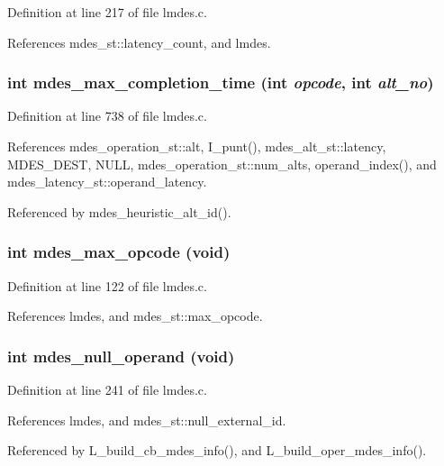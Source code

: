 Definition at line 217 of file lmdes.c.

References mdes\_\-st::latency\_\-count, and lmdes.
\subsubsection{\setlength{\rightskip}{0pt plus 5cm}int mdes\_\-max\_\-completion\_\-time (int {\em opcode}, int {\em alt\_\-no})}\label{lmdes_8c_589f30951568d11531047a7b3404e6ac}




Definition at line 738 of file lmdes.c.

References mdes\_\-operation\_\-st::alt, I\_\-punt(), mdes\_\-alt\_\-st::latency, MDES\_\-DEST, NULL, mdes\_\-operation\_\-st::num\_\-alts, operand\_\-index(), and mdes\_\-latency\_\-st::operand\_\-latency.

Referenced by mdes\_\-heuristic\_\-alt\_\-id().
\subsubsection{\setlength{\rightskip}{0pt plus 5cm}int mdes\_\-max\_\-opcode (void)}\label{lmdes_8c_87c24ac7a003ff4ced90a725d84644f0}




Definition at line 122 of file lmdes.c.

References lmdes, and mdes\_\-st::max\_\-opcode.
\subsubsection{\setlength{\rightskip}{0pt plus 5cm}int mdes\_\-null\_\-operand (void)}\label{lmdes_8c_57537f171f1012dd9f07c719b258cec3}




Definition at line 241 of file lmdes.c.

References lmdes, and mdes\_\-st::null\_\-external\_\-id.

Referenced by L\_\-build\_\-cb\_\-mdes\_\-info(), and L\_\-build\_\-oper\_\-mdes\_\-info().

